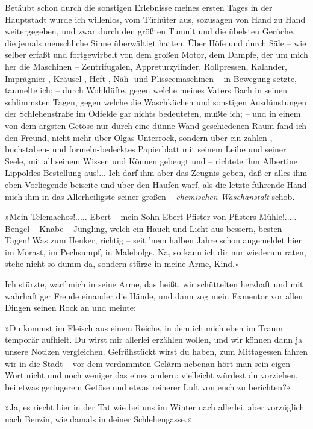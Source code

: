 Betäubt schon durch die sonstigen Erlebnisse meines ersten Tages in
der Hauptstadt wurde ich willenlos, vom Türhüter aus, sozusagen von
Hand zu Hand weitergegeben, und zwar durch den größten Tumult und
die übelsten Gerüche, die jemals menschliche Sinne überwältigt
hatten. Über Höfe und durch Säle – wie selber erfaßt und
fortgewirbelt von dem großen Motor, dem Dampfe, der um mich her die
Maschinen – Zentrifugalen, Appreturzylinder, Rollpressen, Kalander,
Imprägnier-, Kräusel-, Heft-, Näh- und Plisseemaschinen – in
Bewegung setzte, taumelte ich; – durch Wohldüfte, gegen welche
meines Vaters Bach in seinen schlimmsten Tagen, gegen welche die
Waschküchen und sonstigen Ausdünstungen der Schlehenstraße im
Ödfelde gar nichts bedeuteten, mußte ich; – und in einem von dem
ärgsten Getöse nur durch eine dünne Wand geschiedenen Raum fand ich
den Freund, nicht mehr über Olgas Unterrock, sondern über ein
zahlen-, buchstaben- und formeln-bedecktes Papierblatt mit seinem
Leibe und seiner Seele, mit all seinem Wissen und Können gebeugt
und – richtete ihm Albertine Lippoldes Bestellung aus!... Ich darf
ihm aber das Zeugnis geben, daß er alles ihm eben Vorliegende
beiseite und über den Haufen warf, als die letzte führende Hand
mich ihm in das Allerheiligste seiner großen –
\emph{chemischen Waschanstalt} schob.~–

»Mein Telemachos!..... Ebert – mein Sohn Ebert Pfister von Pfisters
Mühle!..... Bengel – Knabe – Jüngling, welch ein Hauch und Licht
aus bessern, besten Tagen! Was zum Henker, richtig – seit 'nem
halben Jahre schon angemeldet hier im Morast, im Pechsumpf, in
Malebolge. Na, so kann ich dir nur wiederum raten, stehe nicht so
dumm da, sondern stürze in meine Arme, Kind.«

Ich stürzte, warf mich in seine Arme, das heißt, wir schüttelten
herzhaft und mit wahrhaftiger Freude einander die Hände, und dann
zog mein Exmentor vor allen Dingen seinen Rock an und meinte:

»Du kommst im Fleisch aus einem Reiche, in dem ich mich eben im
Traum temporär aufhielt. Du wirst mir allerlei erzählen wollen, und
wir können dann ja unsere Notizen vergleichen. Gefrühstückt wirst
du haben, zum Mittagessen fahren wir in die Stadt – vor dem
verdammten Gelärm nebenan hört man sein eigen Wort nicht und noch
weniger das eines andern: vielleicht würdest du vorziehen, bei
etwas geringerem Getöse und etwas reinerer Luft von euch zu
berichten?«

»Ja, es riecht hier in der Tat wie bei uns im Winter nach allerlei,
aber vorzüglich nach Benzin, wie damals in deiner Schlehengasse.«

